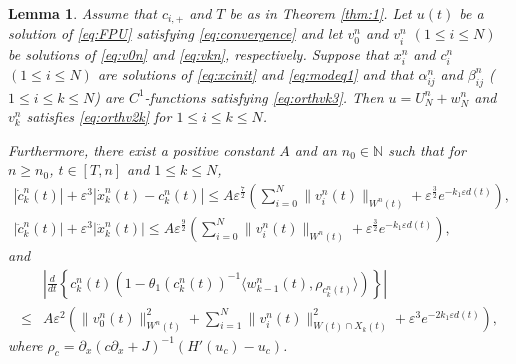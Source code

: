 \documentclass[11pt]{amsart}
\newtheorem{lemma}[theorem]{Lemma}
\theoremstyle{remark}
\numberwithin{equation}{section}
\begin{document}
\begin{lemma}
  \label{lem:modulation-u}
Assume that $c_{i,+}$ and $T$ be as in Theorem \ref{thm:1}.
Let $u(t)$  be a solution of \eqref{eq:FPU} satisfying \eqref{eq:convergence}
and let $v_0^n$ and $v_i^n$ $(1\le i\le N)$ be solutions of \eqref{eq:v0n} and 
\eqref{eq:vkn}, respectively. Suppose that $x_i^n$ and $c_i^n$
$(1\le i\le N)$ are solutions of  \eqref{eq:xcinit} and \eqref{eq:modeq1}
and that $\alpha_{ij}^n$ and $\beta_{ij}^n$ ($1\le i\le k\le N$) are
$C^1$-functions satisfying \eqref{eq:orthvk3}.
Then $u=U_N^n+w_N^n$ and 
$v_k^n$ satisfies \eqref{eq:orthv2k} for $1\le i\le k\le N$.
\par
Furthermore, there exist a positive constant $A$ and  an $n_0\in{\mathbb{N}}$ such that
for  $n\ge n_0$, $t\in[T,n]$ and $1\le k\le N$,
\begin{gather*}
|\dot{c}_k^n(t)|+{\varepsilon}^3|\dot{x}_k^n(t)-c_k^n(t)| \le A{\varepsilon}^{\frac72}
\left(\sum_{i=0}^N\|v_i^n(t)\|_{W^n(t)}+{\varepsilon}^{\frac32}e^{-k_1{\varepsilon} d(t)}\right),\\
|\ddot{c}_k^n(t)|+{\varepsilon}^3|\ddot{x}_k^n(t)|\le A{\varepsilon}^{\frac92}
\left(\sum_{i=0}^N\|v_i^n(t)\|_{W^n(t)}+{\varepsilon}^{\frac32}e^{-k_1{\varepsilon} d(t)}\right),
\end{gather*}
and 
\begin{equation}
\label{eq:c-u}
  \begin{split}
 & \left|\frac{d}{dt}\left\{c_k^n(t)\left(1-\theta_1(c_k^n(t))^{-1}
{\langle} w_{k-1}^n(t),\rho_{c_k^n(t)}{\rangle}\right)\right\}\right|
\\ \le  &
A{\varepsilon}^2\left(\|v_0^n(t)\|_{W^n(t)}^2+\sum_{i=1}^N\|v_i^n(t)\|_{W(t)\cap X_k(t)}^2
+{\varepsilon}^3e^{-2k_1{\varepsilon} d(t)}\right),
  \end{split}
\end{equation}
where $\rho_c={\partial}_x(c{\partial}_x+J)^{-1}(H'(u_c)-u_c)$.
\end{lemma}
\end{document}
